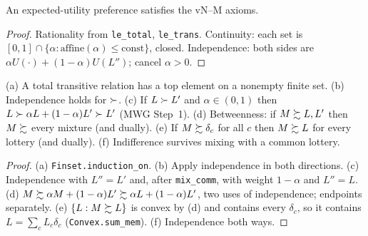\begin{proposition}
\label{prop:vnm-easy}
\leanok
{}
An expected-utility preference satisfies the vN--M axioms.
\end{proposition}
\begin{proof}
\leanok
Rationality from \texttt{le\_total}, \texttt{le\_trans}. Continuity: each set is
$[0,1] \cap \{\alpha : \text{affine}(\alpha) \le \text{const}\}$, closed. Independence: both sides
are $\alpha U(\cdot) + (1-\alpha)U(L'')$; cancel $\alpha > 0$.
\end{proof}

\begin{lemma}
\label{lem:vnm-consequences}
\leanok
{}
(a) A total transitive relation has a top element on a nonempty finite set. (b) Independence holds
for $\succ$. (c) If $L \succ L'$ and $\alpha\in(0,1)$ then $L \succ \alpha L + (1-\alpha)L' \succ L'$
(MWG Step~1). (d) Betweenness: if $M \succsim L, L'$ then $M \succsim$ every mixture (and dually).
(e) If $M \succsim \delta_c$ for all $c$ then $M \succsim L$ for every lottery (and dually).
(f) Indifference survives mixing with a common lottery.
\end{lemma}
\begin{proof}
\leanok
(a) \texttt{Finset.induction\_on}. (b) Apply independence in both directions. (c) Independence with
$L'' = L'$ and, after \texttt{mix\_comm}, with weight $1-\alpha$ and $L'' = L$. (d) $M \succsim \alpha M +
(1-\alpha)L' \succsim \alpha L + (1-\alpha)L'$, two uses of independence; endpoints separately.
(e) $\{L : M \succsim L\}$ is convex by (d) and contains every $\delta_c$, so it contains
$L = \sum_c L_c\delta_c$ (\texttt{Convex.sum\_mem}). (f) Independence both ways.
\end{proof}

